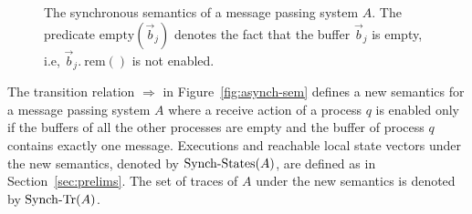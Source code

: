 \begin{figure} [t]
\footnotesize{
  \centering
  \begin{mathpar}

    
    
  \end{mathpar}
  }
  \caption{The synchronous semantics of a message passing system $A$. The predicate $\mathrm{empty}(\vec{b}_j)$ denotes the fact that the buffer $\vec{b}_j$ is empty, i.e, $\vec{b}_j.\ \mathrm{rem}()$ is not enabled.}
  \label{fig:synch-sem}
\end{figure}

The transition relation $\Rightarrow$ in Figure~\ref{fig:asynch-sem} defines a new semantics for  a message passing system $A$
where a receive action of a process $q$ is enabled only if the buffers of all the other processes are empty and the buffer of process $q$
contains exactly one message. Executions and reachable local
state vectors under the new semantics, denoted by $\synch{States}(A)$, are defined as in Section~\ref{sec:prelims}.
The set of traces of $A$ under the new semantics is denoted by $\synch{Tr}(A)$.

